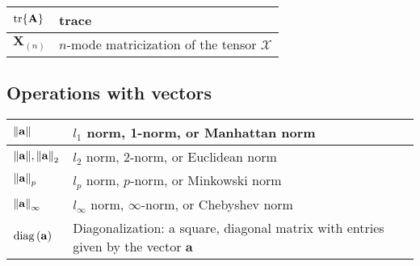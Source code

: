 \documentclass{article}
\begin{document}
\begin{xltabular}{\textwidth}{XX}
	\(\tr{\mathbf{A}}\)                                                                                  & trace                                                                                                                                                                           \\ \hline
	\(\mathbf{X}_{(n)}\)                                                                                 & \(n\)-mode matricization of the tensor \(\bm{\mathcal{X}}\)                                                                                                                     \\
\end{xltabular}
\subsection{Operations with vectors}
\begin{xltabular}{\textwidth}{XX}
	\(\norm{\mathbf{a}}\)                      & \(l_1\) norm, 1-norm, or Manhattan norm                                                    \\ \hline
	\(\norm{\mathbf{a}}, \norm{\mathbf{a}}_2\) & \(l_2\) norm, 2-norm, or Euclidean norm                                                    \\ \hline
	\(\norm{\mathbf{a}}_p\)                    & \(l_p\) norm, \(p\)-norm, or Minkowski norm                                                \\ \hline
	\(\norm{\mathbf{a}}_\infty\)               & \(l_\infty\) norm, \(\infty\)-norm, or Chebyshev norm                                      \\ \hline
	\(\operatorname{diag}\left(\mathbf{a}\right)\)                      & Diagonalization: a square, diagonal matrix with entries given by the vector \(\mathbf{a}\) \\
\end{xltabular}
\end{document}
